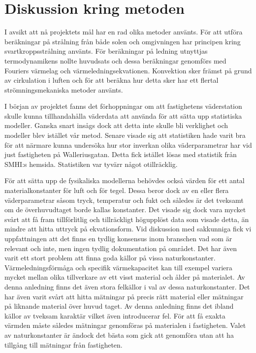 \section{Diskussion kring metoden}\label{sec:discmethod}

I avsikt att nå projektets mål har en rad olika metoder använts. För att utföra beräkningar på strålning från både solen och
omgivningen har principen kring svartkroppsstrålning använts. För beräkningar på ledning utnyttjas termodynamikens nollte huvudsats
och dessa beräkningar genomförs med Fouriers värmelag och värmeledningsekvationen. Konvektion sker främst på grund av cirkulation i luften och för att beräkna hur
detta sker har ett flertal strömningsmekaniska metoder använts.

I början av projektet fanns det förhoppningar om att fastighetens väderstation skulle kunna tillhandahålla väderdata att använda för att sätta upp statistiska modeller. 
Ganska snart insågs dock att detta inte skulle bli verklighet och modeller blev istället vår metod. Senare visade sig att statistiken hade
varit bra för att närmare kunna undersöka hur stor inverkan olika väderparametrar har vid just fastigheten på Walleriusgatan. 
Detta fick istället lösas med statistik från SMHI:s hemsida. Statistiken var tyvärr något otillräcklig.

För att sätta upp de fysikaliska modellerna behövdes också värden för ett antal materialkonstanter för luft och för tegel. 
Dessa beror dock av en eller flera väderparametrar såsom tryck, temperatur och fukt och således är det tveksamt om de överhuvudtaget borde kallas konstanter. 
Det visade sig dock vara mycket svårt att få fram tillförlitlig och tillräckligt högupplöst data som visade detta, än mindre att hitta uttryck på ekvationsform.
Vid diskussion med sakkunniga fick vi uppfattningen att det finns en tydlig konsensus inom branschen vad som är relevant och inte, men ingen tydlig dokumentation på området.
Det har även varit ett stort problem att finna goda källor på vissa naturkonstanter. Värmeledningsförmåga och specifik värmekapacitet kan till exempel
variera mycket mellan olika tillverkare av ett visst material och ålder på materialet. Av denna anledning finns det även stora felkällor i val av dessa naturkonstanter. Det har även
varit svårt att hitta mätningar på precis rätt material eller mätningar på liknande material över huvud taget. Av denna anledning finns det ibland
källor av tveksam karaktär vilket även introducerar fel. För att få exakta värmden måste således mätningar genomföras på materialen i fastigheten. Valet av
naturkonstanter är ändock det bästa som gick att genomföra utan att ha tillgång till mätningar från fastigheten.


